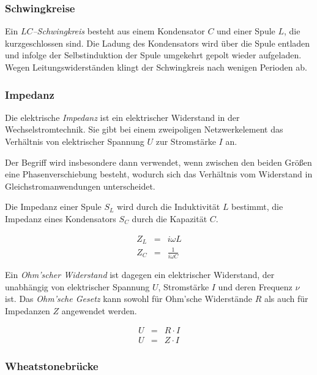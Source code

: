 \documentclass[12pt,a4paper]{scrartcl}
\numberwithin{equation}{section} %
\begin{document}
\hypertarget{schwingkreise}{%
\subsubsection{Schwingkreise}\label{schwingkreise}}

Ein \emph{$LC$--Schwingkreis} besteht aus einem Kondensator $C$ und einer Spule $L$, die kurzgeschlossen sind. Die Ladung des Kondensators wird über die Spule entladen und infolge der Selbstinduktion der Spule umgekehrt gepolt wieder aufgeladen. Wegen Leitungswiderständen klingt der Schwingkreis nach wenigen Perioden ab.

\hypertarget{impedanz}{%
\subsubsection{Impedanz}\label{impedanz}}

Die elektrische \emph{Impedanz} ist ein elektrischer Widerstand in der Wechselstromtechnik. Sie gibt bei einem zweipoligen Netzwerkelement das Verhältnis von elektrischer Spannung $U$ zur Stromstärke $I$ an.

Der Begriff wird insbesondere dann verwendet, wenn zwischen den beiden Größen eine Phasenverschiebung besteht, wodurch sich das Verhältnis vom Widerstand in Gleichstromanwendungen unterscheidet.

Die Impedanz einer Spule $S_L$ wird durch die Induktivität $L$ bestimmt, die Impedanz eines Kondensators $S_C$ durch die Kapazität $C$.

\begin{eqnarray}
    Z_L &=& i\omega L \\
    Z_C &=& \frac{1}{i\omega C}
\end{eqnarray}

\noindent
Ein \emph{Ohm'scher Widerstand} ist dagegen ein elektrischer Widerstand, der unabhängig von elektrischer Spannung $U$, Stromstärke $I$ und deren Frequenz $\nu$ ist. Das \emph{Ohm'sche Gesetz} kann sowohl für Ohm'sche Widerstände $R$ als auch für Impedanzen $Z$ angewendet werden.

\begin{eqnarray}
    U &=& R\cdot I \\
    U &=& Z\cdot I
\end{eqnarray}

\hypertarget{wheatstonebruxfccke}{%
\subsubsection{Wheatstonebrücke}\label{wheatstonebruxfccke}}
\end{document}
